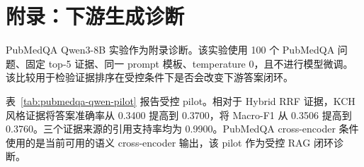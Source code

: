 \section{附录：下游生成诊断}

PubMedQA Qwen3-8B 实验作为附录诊断。该实验使用 100 个 PubMedQA 问题、固定 top-5 证据、同一 prompt 模板、temperature 0，且不进行模型微调。该比较用于检验证据排序在受控条件下是否会改变下游答案闭环。

表~\ref{tab:pubmedqa-qwen-pilot} 报告受控 pilot。相对于 Hybrid RRF 证据，KCH 风格证据将答案准确率从 0.3400 提高到 0.3700，将 Macro-F1 从 0.3506 提高到 0.3760。三个证据来源的引用支持率均为 0.9900。PubMedQA cross-encoder 条件使用的是当前可用的语义 cross-encoder 输出，该 pilot 作为受控 RAG 闭环诊断。


